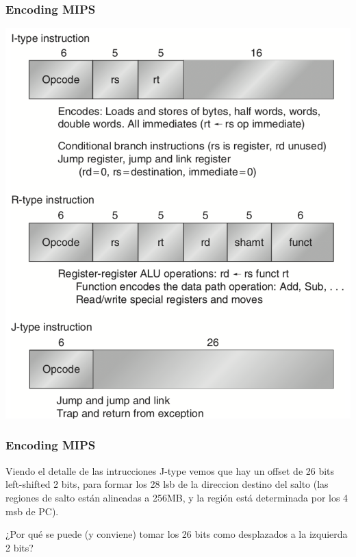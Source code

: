 \documentclass{beamer}
\begin{document}
\begin{frame}
 \frametitle{Encoding MIPS} 
 
 \begin{center}
 \includegraphics[scale=.4,keepaspectratio=true]{tipos_instruccion.png}
\end{center}
 \end{frame}


\begin{frame}
 \frametitle{Encoding MIPS} 

 Viendo el detalle de las intrucciones J-type vemos que hay un offset de 26 bits left-shifted 2 bits, para formar los 28 lsb de la direccion destino del salto (las regiones de salto están alineadas a 256MB, y la región está determinada por los 4 msb de PC).
 
 \bigskip

 ¿Por qué se puede (y conviene) tomar los 26 bits como desplazados a la izquierda 2 bits?
\end{frame}
\end{document}
